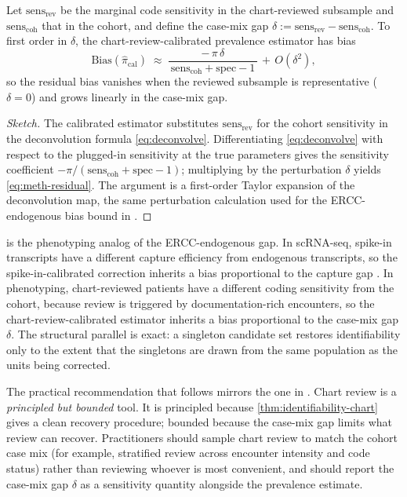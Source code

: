\begin{corollary}
\label{cor:casemix}
Let $\mathrm{sens}_{\text{rev}}$ be the marginal code sensitivity in
the chart-reviewed subsample and $\mathrm{sens}_{\text{coh}}$ that in
the cohort, and define the case-mix gap $\delta := \mathrm{sens}_{\text{rev}}
- \mathrm{sens}_{\text{coh}}$. To first order in $\delta$, the
chart-review-calibrated prevalence estimator has bias
\begin{equation}
  \mathrm{Bias}(\hat\pi_{\text{cal}})
    \;\approx\;
    \frac{-\,\pi\,\delta}
         {\,\mathrm{sens}_{\text{coh}} + \mathrm{spec} - 1\,}
    \,+\, O(\delta^2),
  \label{eq:meth-residual}
\end{equation}
so the residual bias vanishes when the reviewed subsample is
representative ($\delta = 0$) and grows linearly in the case-mix gap.
\end{corollary}

\begin{proof}[Sketch]
The calibrated estimator substitutes $\mathrm{sens}_{\text{rev}}$ for
the cohort sensitivity in the deconvolution formula
\eqref{eq:deconvolve}. Differentiating \eqref{eq:deconvolve} with
respect to the plugged-in sensitivity at the true parameters gives the
sensitivity coefficient $-\pi/(\mathrm{sens}_{\text{coh}} +
\mathrm{spec} - 1)$; multiplying by the perturbation $\delta$ yields
\eqref{eq:meth-residual}. The argument is a first-order Taylor
expansion of the deconvolution map, the same perturbation calculation
used for the ERCC-endogenous bias bound in
\citet[\S 7]{towell2026scrnacoarsening}.
\end{proof}

 is the phenotyping analog of the ERCC-endogenous
gap. In scRNA-seq, spike-in transcripts have a different capture
efficiency from endogenous transcripts, so the spike-in-calibrated
correction inherits a bias proportional to the capture gap
\citep{towell2026scrnacoarsening}. In phenotyping, chart-reviewed
patients have a different coding sensitivity from the cohort, because
review is triggered by documentation-rich encounters, so the
chart-review-calibrated estimator inherits a bias proportional to the
case-mix gap $\delta$. The structural parallel is exact: a singleton
candidate set restores identifiability only to the extent that the
singletons are drawn from the same population as the units being
corrected.

The practical recommendation that follows mirrors the one in
\citet{towell2026scrnacoarsening}. Chart review is a
\emph{principled but bounded} tool. It is principled because
\cref{thm:identifiability-chart} gives a clean recovery procedure;
bounded because the case-mix gap limits what review can recover.
Practitioners should sample chart review to match the cohort case mix
(for example, stratified review across encounter intensity and code
status) rather than reviewing whoever is most convenient, and should
report the case-mix gap $\delta$ as a sensitivity quantity alongside
the prevalence estimate.


